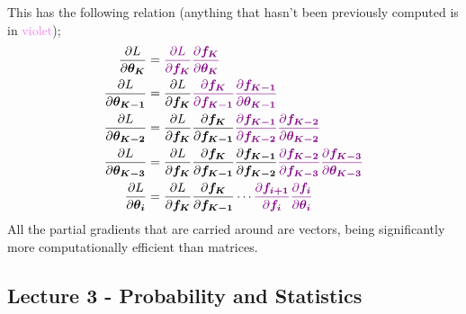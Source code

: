 \documentclass[a4paper, 12pt]{article}
\newcommand{\pdif}[2]{\frac{\partial #1}{\partial #2}}
\renewcommand{\vec}[1]{\boldsymbol{#1}}
\newcommand{\violet}[1]{\textcolor{violet}{#1}}
\begin{document}
                This has the following relation (anything that hasn't been previously computed is in \violet{violet});
                \begin{align*}
                    \pdif{L}{\vec{\theta_K}} & = \violet{\pdif{L}{\vec{f_K}} \pdif{\vec{f_K}}{\vec{\theta_K}}} \\
                    \pdif{L}{\vec{\theta_{K - 1}}} & = \pdif{L}{\vec{f_K}} \violet{\pdif{\vec{f_K}}{\vec{f_{K - 1}}} \pdif{\vec{f_{K - 1}}}{\vec{\theta_{K - 1}}}} \\
                    \pdif{L}{\vec{\theta_{K - 2}}} & = \pdif{L}{\vec{f_K}} \pdif{\vec{f_K}}{\vec{f_{K - 1}}} \violet{\pdif{\vec{f_{K - 1}}}{\vec{f_{K - 2}}} \pdif{\vec{f_{K - 2}}}{\vec{\theta_{K - 2}}}} \\
                    \pdif{L}{\vec{\theta_{K - 3}}} & = \pdif{L}{\vec{f_K}} \pdif{\vec{f_K}}{\vec{f_{K - 1}}} \pdif{\vec{f_{K - 1}}}{\vec{f_{K - 2}}} \violet{\pdif{\vec{f_{K - 2}}}{\vec{f_{K - 3}}} \pdif{\vec{f_{K - 3}}}{\vec{\theta_{K - 3}}}} \\
                    \pdif{L}{\vec{\theta_i}} & = \pdif{L}{\vec{f_K}} \pdif{\vec{f_K}}{\vec{f_{K - 1}}} \cdots \violet{\pdif{\vec{f_{i + 1}}}{\vec{f_i}} \pdif{\vec{f_i}}{\vec{\theta_i}}}
                \end{align*}
                All the partial gradients that are carried around are vectors, being significantly more computationally efficient than matrices.
        \subsection*{Lecture 3 - Probability and Statistics}
\end{document}
